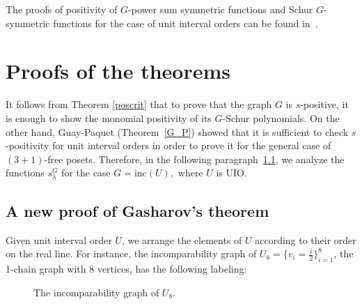 \documentclass{article}
\theoremstyle{plain}
\theoremstyle{definition}
\begin{document}
The proofs of positivity of $G$-power sum symmetric functions and  Schur $G$-symmetric functions for the case of unit interval orders can be found in~\cite{Paunov16}.



\section{Proofs of the theorems}\label{proofs}

It follows from Theorem \ref{poscrit} that to prove that the graph $G$ is $s$-positive, it is enough to show the monomial positivity of its $G$-Schur polynomials. On the other hand, Guay-Paquet (Theorem~\ref{G_P}) showed that it is sufficient to check $s$-positivity for unit interval orders in order to prove it for the general case of $(3+1)$-free posets. Therefore, in the following paragraph~\ref{Gashproof}, we analyze the functions $s_{\lambda}^G$ for the case $G=\text{inc}(U),$ where $U$ is UIO.










\subsection{A new proof of Gasharov's theorem}\label{Gashproof}

Given unit interval order $U$, we arrange the elements of $U$ according to their order on the real line. For instance, the incomparability graph of $U_8=\{v_i=\frac{i}{2}\}_{i=1}^8$, the 1-chain graph with 8 vertices, has the following labeling:

\begin{figure}[H]
\hspace*{+0.5cm} 
\medskip
\caption{The incomparability graph of $U_8$.}
\label{P_8_1}
\end{figure}
\end{document}
